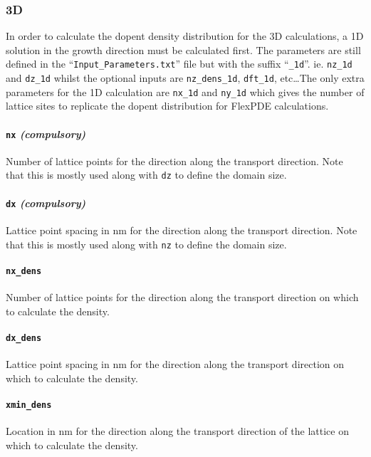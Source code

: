 \documentclass[12pt]{article}
\begin{document}
\subsubsection{3D}

In order to calculate the dopent density distribution for the 3D calculations, a 1D
solution in the growth direction must be calculated first.  The parameters are still
defined in the ``\texttt{Input\_Parameters.txt}'' file but with the suffix ``\texttt{\_1d}''.
ie. \texttt{nz\_1d} and \texttt{dz\_1d} whilst the optional inputs are \texttt{nz\_dens\_1d},
\texttt{dft\_1d}, etc\ldots  The only extra parameters for the 1D calculation are
\texttt{nx\_1d} and \texttt{ny\_1d} which gives the number of lattice sites to replicate
the dopent distribution for FlexPDE calculations.

\paragraph{\texttt{nx} \emph{(compulsory)}}
Number of lattice points for the direction along the transport direction.  Note
that this is mostly used along with \texttt{dz} to define the domain size.

\paragraph{\texttt{dx} \emph{(compulsory)}}
Lattice point spacing in nm for the direction along the transport direction.
Note that this is mostly used along with \texttt{nz} to define the domain size.

\paragraph{\texttt{nx\_dens}}
Number of lattice points for the direction along the transport direction on which
to calculate the density.

\paragraph{\texttt{dx\_dens}}
Lattice point spacing in nm for the direction along the transport direction on
which to calculate the density.

\paragraph{\texttt{xmin\_dens}}
Location in nm for the direction along the transport direction of the lattice on
which to calculate the density.
\end{document}
